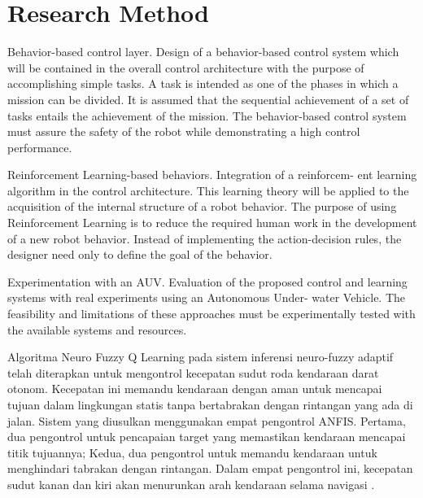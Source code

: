 \section{Research Method}



Behavior-based control layer. Design of a behavior-based control system which will be contained in the overall control architecture with the purpose of accomplishing simple tasks. A task is intended as one of the phases in which a mission can be divided. It is assumed that the sequential achievement of a set of tasks entails the achievement of the mission. The behavior-based control system must assure the safety of the robot while demonstrating a high control performance.

Reinforcement Learning-based behaviors. Integration of a reinforcem- ent learning algorithm in the control architecture. This learning theory will be applied to the acquisition of the internal structure of a robot behavior. The purpose of using Reinforcement Learning is to reduce the required human work in the development of a new robot behavior. Instead of implementing the action-decision rules, the designer need only to define the goal of the behavior.

Experimentation with an AUV. Evaluation of the proposed control and learning systems with real experiments using an Autonomous Under- water Vehicle. The feasibility and limitations of these approaches must be experimentally tested with the available systems and resources.


Algoritma Neuro Fuzzy Q Learning pada sistem inferensi neuro-fuzzy adaptif telah diterapkan untuk mengontrol kecepatan sudut roda kendaraan darat otonom. Kecepatan ini memandu kendaraan dengan aman untuk mencapai tujuan dalam lingkungan statis tanpa bertabrakan dengan rintangan yang ada di jalan. Sistem yang diusulkan menggunakan empat pengontrol ANFIS. Pertama, dua pengontrol untuk pencapaian target yang memastikan kendaraan mencapai titik tujuannya; Kedua, dua pengontrol untuk memandu kendaraan untuk menghindari tabrakan dengan rintangan. Dalam empat pengontrol ini, kecepatan sudut kanan dan kiri akan menurunkan arah kendaraan selama navigasi \cite{Al-mayyahi2014}.
      

